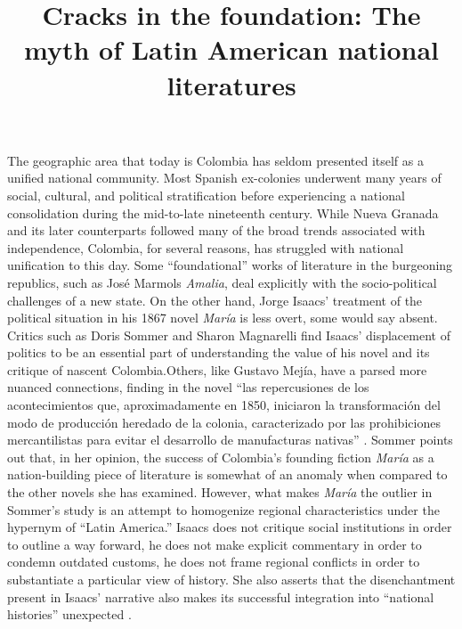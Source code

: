 \documentclass[12pt]{report}
\title{Cracks in the foundation: The myth of Latin American national literatures}
\begin{document}

The geographic area that today is Colombia has seldom presented itself as a unified national community. Most Spanish ex-colonies underwent many years of social, cultural, and political stratification before experiencing a national consolidation during the mid-to-late nineteenth century. 
While Nueva Granada and its later counterparts followed many of the broad trends associated with independence, Colombia, for several reasons, has struggled with national unification to this day.
Some \enquote{foundational} works of literature in the burgeoning republics, such as José Marmols \textit{Amalia}, deal explicitly with the socio-political challenges of a new state.
On the other hand, Jorge Isaacs’ treatment of the political situation in his 1867 novel \textit{María} is less overt, some would say absent. Critics such as Doris Sommer and Sharon Magnarelli find Isaacs’ displacement of politics to be an essential part of understanding the value of his novel and its critique of nascent Colombia.Others, like Gustavo Mejía, have a parsed more nuanced connections, finding in the novel \enquote{las repercusiones de los acontecimientos que, aproximadamente en 1850, iniciaron la transformación del modo de producción heredado de la colonia, caracterizado por las prohibiciones mercantilistas para evitar el desarrollo de manufacturas nativas} \autocite[262]{Mejia1976}.
Sommer points out that, in her opinion, the success of Colombia's founding fiction \textit{María} as a nation-building piece of literature is somewhat of an anomaly when compared to the other novels she has examined. 
However, what makes \textit{María} the outlier in Sommer's study is an attempt to homogenize regional characteristics under the hypernym of \enquote{Latin America.}
Isaacs does not critique social institutions in order to outline a way forward, he does not make explicit commentary in order to condemn outdated customs, he does not frame regional conflicts in order to substantiate a particular view of history. 
She also asserts that the disenchantment present in Isaacs' narrative also makes its successful integration into \enquote{national histories} unexpected \autocite[30]{Sommer1991}.
\end{document}

